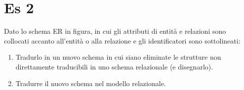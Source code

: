 \newpage
\section{Es 2}
\noindent Dato lo schema ER in figura, in cui gli attributi di entità e relazioni sono collocati accanto all'entità o alla relazione e gli identificatori sono sottolineati:

\begin{enumerate}
    \item Tradurlo in un nuovo schema in cui siano eliminate le strutture non direttamente traducibili in uno schema relazionale (e disegnarlo).
    \item Tradurre il nuovo schema nel modello relazionale.
\end{enumerate}

\vspace{1cm}

